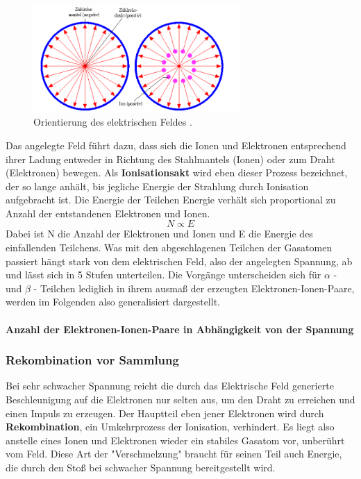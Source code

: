\begin{figure} %
  \centering
  \includegraphics[width=0.7\textwidth]{bilder/Abbildung3.png}
  \caption{Orientierung des elektrischen Feldes \cite{leifi}.} 
  \label{fig:efeld}
\end{figure}

Das angelegte Feld führt dazu, dass sich die Ionen und Elektronen entsprechend ihrer Ladung entweder in Richtung des Stahlmantels (Ionen) oder zum Draht (Elektronen) bewegen.
Als \textbf{Ionisationsakt} wird eben dieser Prozess bezeichnet, der so lange anhält, bis jegliche Energie der Strahlung durch Ionisation aufgebracht ist.
Die Energie der Teilchen Energie verhält sich proportional zu Anzahl der entstandenen Elektronen und Ionen. 
\begin{equation}
\label{eqn:prop}
N \propto E
\end{equation}
Dabei ist N die Anzahl der Elektronen und Ionen und E die Energie des einfallenden Teilchens.
Was mit den abgeschlagenen Teilchen der Gasatomen passiert hängt stark von dem elektrischen Feld, also der angelegten Spannung, ab und lässt sich in 5 Stufen unterteilen.
Die Vorgänge unterscheiden sich für $\alpha$ - und $\beta$ - Teilchen lediglich in ihrem ausmaß der erzeugten Elektronen-Ionen-Paare, werden im Folgenden also generalisiert dargestellt.
\paragraph{Anzahl der Elektronen-Ionen-Paare in Abhängigkeit von der Spannung} \mbox{}

\subsubsection{Rekombination vor Sammlung}
\label{sub:Rekombination}
Bei sehr schwacher Spannung reicht die durch das Elektrische Feld generierte Beschleunigung auf die Elektronen nur selten aus, um den Draht zu erreichen und einen Impuls zu erzeugen.
Der Hauptteil eben jener Elektronen wird durch \textbf{Rekombination}, ein Umkehrprozess der Ionisation, verhindert. Es liegt also anstelle eines Ionen und Elektronen wieder ein stabiles Gasatom vor, unberührt vom Feld.
Diese Art der "Verschmelzung" braucht für seinen Teil auch Energie, die durch den Stoß bei schwacher Spannung bereitgestellt wird.
